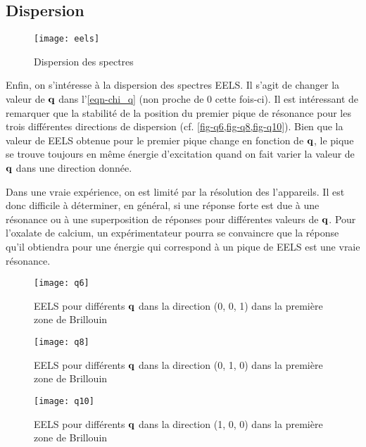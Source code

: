 \subsection{Dispersion}
\begin{wrapfigure}[25]{r}{0.4\textwidth}
  \centering
  \texttt{[image: eels]}
  \caption{Dispersion des spectres}\label{fig-dispersion}
\end{wrapfigure}
Enfin, on s'intéresse à la dispersion des spectres EELS\@.
Il s'agit de changer la valeur de $\vb{q}$ dans l'\cref{eqn-chi_q} (non proche de 0 cette fois-ci).
Il est intéressant de remarquer que la stabilité de la position du premier pique de résonance
pour les trois différentes directions de dispersion (cf. \cref{fig-q6,fig-q8,fig-q10}).
Bien que la valeur de EELS obtenue pour le premier pique change en fonction de $\vb{q}$,
le pique se trouve toujours en même énergie d'excitation
quand on fait varier la valeur de $\vb{q}$ dans une direction donnée.

Dans une vraie expérience, on est limité par la résolution des l'appareils.
Il est donc difficile à déterminer, en général, si une réponse forte est due
à une résonance ou à une superposition de réponses pour différentes valeurs de $\vb{q}$.
Pour l'oxalate de calcium, un expérimentateur pourra se convaincre que la réponse qu'il obtiendra
pour une énergie qui correspond à un pique de EELS est une vraie résonance.

\begin{figure}[!b]
    \centering
    \texttt{[image: q6]}
    \captionsetup{width=0.6\textwidth}
    \caption{EELS pour différents $\vb{q}$ dans la direction (0, 0, 1) dans la première zone de Brillouin}\label{fig-q6}
\end{figure}
\clearpage
\begin{figure}[!htb]
    \centering
    \texttt{[image: q8]}
    \captionsetup{width=0.6\textwidth}
    \caption{EELS pour différents $\vb{q}$ dans la direction (0, 1, 0) dans la première zone de Brillouin}\label{fig-q8}
\end{figure}

\begin{figure}[!htb]
    \centering
    \texttt{[image: q10]}
    \captionsetup{width=0.6\textwidth}
    \caption{EELS pour différents $\vb{q}$ dans la direction (1, 0, 0) dans la première zone de Brillouin}\label{fig-q10}
\end{figure}
